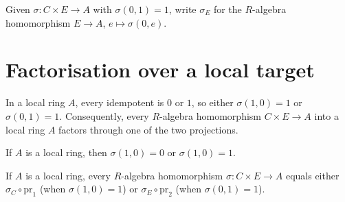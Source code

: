 \begin{definition}
  \label{def:compSndSection}
  \leanok
  Given $\sigma : C \times E \to A$ with $\sigma(0, 1) = 1$, write
  $\sigma_E$ for the $R$-algebra homomorphism $E \to A$, $e \mapsto \sigma(0, e)$.
\end{definition}

\section{Factorisation over a local target}

In a local ring $A$, every idempotent is $0$ or $1$, so either
$\sigma(1, 0) = 1$ or $\sigma(0, 1) = 1$. Consequently, every $R$-algebra
homomorphism $C \times E \to A$ into a local ring $A$ factors through one of
the two projections.

\begin{lemma}
  \label{lem:apply-inl-zero-or-one}
  \leanok
  If $A$ is a local ring, then $\sigma(1, 0) = 0$ or $\sigma(1, 0) = 1$.
\end{lemma}

\begin{lemma}
  \label{lem:section-of-isLocalRing}
  \leanok
  If $A$ is a local ring, every $R$-algebra homomorphism $\sigma : C \times E
  \to A$ equals either $\sigma_C \circ \mathrm{pr}_1$ (when $\sigma(1, 0) = 1$)
  or $\sigma_E \circ \mathrm{pr}_2$ (when $\sigma(0, 1) = 1$).
\end{lemma}
